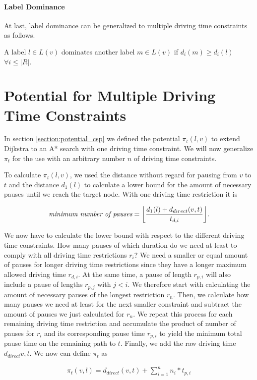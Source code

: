 \paragraph{Label Dominance}
At last, label dominance can be generalized to multiple driving time constraints as follows.
\begin{definition}
	A label $l \in L(v)$ dominates another label $m \in L(v)$ if $d_i(m) \ge d_i(l)$ $\forall i \le |R|$.
\end{definition}

\section{Potential for Multiple Driving Time Constraints}
In section \ref{section:potential_csp} we defined the potential $\pi_t(l,v)$ to extend Dijkstra to an A* search with one driving time constraint. We will now generalize $\pi_t$ for the use with an arbitrary number $n$ of driving time constraints.

To calculate $\pi_t(l,v)$, we used the distance without regard for pausing from $v$ to $t$ and the distance $d_1(l)$ to calculate a lower bound for the amount of necessary pauses until we reach the target node. With one driving time restriction it is

\[\textit{minimum number of pauses} = \floor*{ \frac{d_{1}(l) + d_{direct}(v,t)}{t_{d,i}} }.\]

We now have to calculate the lower bound with respect to the different driving time constraints. How many pauses of which duration do we need at least to comply with all driving time restrictions $r_i$? We need a smaller or equal amount of pauses for longer driving time restrictions since they have a longer maximum allowed driving time $r_{d,i}$. At the same time, a pause of length $r_{p,i}$ will also include a pause of lengths $r_{p,j}$ with $j < i$. We therefore start with calculating the amount of necessary pauses of the longest restriction $r_n$. Then, we calculate how many pauses we need at least for the next smaller constraint and subtract the amount of pauses we just calculated for $r_n$. We repeat this process for each remaining driving time restriction and accumulate the product of number of pauses for $r_i$ and its corresponding pause time $r_{p,i}$ to yield the minimum total pause time on the remaining path to $t$. Finally, we add the raw driving time $d_{direct}{v,t}$. We now can define $\pi_t$ as

\begin{align*}
	\pi_t(v,l) = d_{direct}(v,t) + \sum_{i=1}^n{ n_i * t_{p,i}}
\end{align*}

